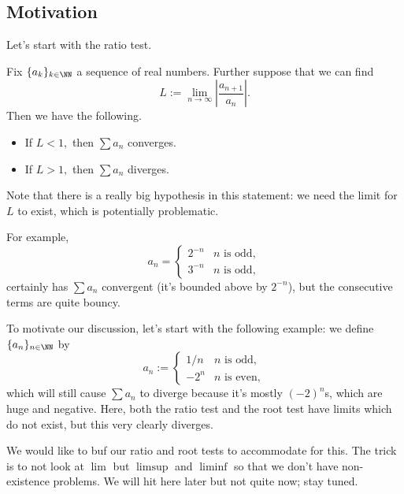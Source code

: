 \subsection{Motivation}
Let's start with the ratio test.
\begin{proposition}
	Fix $\{a_k\}_{k\in\NN}$ a sequence of real numbers. Further suppose that we can find
	\[L:=\lim_{n\to\infty}\left|\frac{a_{n+1}}{a_n}\right|.\]
	Then we have the following.
	\begin{itemize}
		\item If $L<1,$ then $\sum a_n$ converges.
		\item If $L>1,$ then $\sum a_n$ diverges.
	\end{itemize}
\end{proposition}
Note that there is a really big hypothesis in this statement: we need the limit for $L$ to exist, which is potentially problematic.
\begin{example}
	For example,
	\[a_n=\begin{cases}
		2^{-n} & n\text{ is odd}, \\
		3^{-n} & n\text{ is odd},
	\end{cases}\]
	certainly has $\sum a_n$ convergent (it's bounded above by $2^{-n}$), but the consecutive terms are quite bouncy.
\end{example}
To motivate our discussion, let's start with the following example: we define $\{a_n\}_{n\in\NN}$ by
\[a_n:=\begin{cases}
	1/n & n\text{ is odd}, \\
	-2^n & n\text{ is even},
\end{cases}\]
which will still cause $\sum a_n$ to diverge because it's mostly $(-2)^n$s, which are huge and negative. Here, both the ratio test and the root test have limits which do not exist, but this very clearly diverges.

We would like to buf our ratio and root tests to accommodate for this. The trick is to not look at $\lim$ but $\limsup$ and $\liminf$ so that we don't have non-existence problems. We will hit here later but not quite now; stay tuned.

